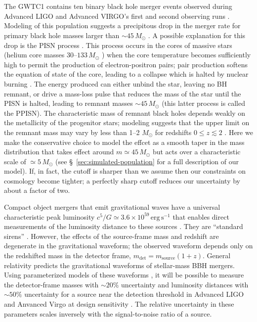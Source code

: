 \documentclass[modern]{aastex62}
\newcommand{\MPISN}{45 \, \MSun{}}
\newcommand{\MTaperScale}{5 \, \MSun{}}
\newcommand{\MSun}{M_\odot}
\begin{document}
\section*{ }

The \ac{GWTC1} contains ten binary black hole merger events observed during
Advanced LIGO and Advanced VIRGO's first and second observing runs
\citep{GWTC-1}. Modeling of this population suggests a precipitous drop in the
merger rate for primary black hole masses larger than $\sim \MPISN{}$
\citep{Fishbach2017,GWTC-1}.  A possible explanation for this drop is the
\ac{PISN} process
\citep{Fowler1964,Rakavy1967,Bond1984,Heger2002,Belczynski2016,Woosley2017,Spera2017}.
This process occurs in the cores of massive stars (helium core masses $30$--$133
\, \MSun$ \citep{Woosley2017}) when the core temperature becomes sufficiently
high to permit the production of electron-positron pairs; pair production
softens the equation of state of the core, leading to a collapse which is halted
by nuclear burning \citep{Heger2002}.  The energy produced can either unbind the
star, leaving no \ac{BH} remnant, or drive a mass-loss pulse that reduces the
mass of the star until the \ac{PISN} is halted, leading to remnant masses $\sim
\MPISN{}$ (this latter process is called the \ac{PPISN}). The characteristic
mass of remnant black holes depends weakly on the metallicity of the progenitor
stars; modeling suggests that the upper limit on the remnant mass may vary by
less than 1--2 $\MSun$ for redshifts $0 \leq z \lesssim 2$
\citep{Belczynski2016,Mapelli2017}.  Here we make the conservative choice to
model the effcet as a smooth taper in the mass distribution that takes effect
around $m \simeq \MPISN{}$ but acts over a characteristic scale of $\simeq
\MTaperScale$ (see \S\ \ref{sec:simulated-population} for a full description of
our model).  If, in fact, the cutoff is sharper than we assume then our
constraints on cosmology become tighter; a perfectly sharp cutoff reduces our
uncertainty by about a factor of two.

Compact object mergers that emit gravitational waves have a universal
characteristic peak luminosity $c^5/G \simeq 3.6 \times 10^{59} \, \mathrm{erg}
\, \mathrm{s}^{-1}$ that enables direct measurements of the luminosity distance
to these sources \citep{Schutz1986}.  They are ``standard sirens''
\citep{Holz2005}. However, the effects of the source-frame mass and redshift are
degenerate in the gravitational waveform; the observed waveform depends only on
the redshifted mass in the detector frame, $m_\mathrm{det} = m_\mathrm{source}
(1 + z)$. General relativity predicts the gravitational waveforms of
stellar-mass \ac{BBH} mergers.  Using parameterized models of these waveforms
\citep{Taracchini2014,Kahn2016,Bohe2017,Chatziioannou2017}, it will be possible
to measure the detector-frame masses with $\sim 20\%$ uncertainty and luminosity
distances \citep{Hogg1999} with $\sim 50\%$ uncertainty for a source near the
detection threshold in Advanced LIGO and Anvanced Virgo at design sensitivity
\citep{Vitale2017}.  The relative uncertainty in these parameters scales
inversely with the signal-to-noise ratio of a source.
\end{document}
